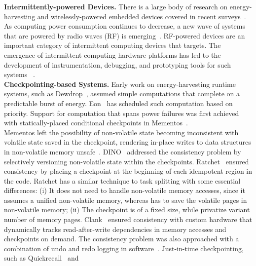 \textbf{Intermittently-powered Devices.} There is a large body of research on
energy-harvesting and wirelessly-powered embedded devices covered in recent
surveys~\cite{prasad_comst_2014,sample_procieee_2013,huang:commag:2015,visser_procieee_2013,kamalinejad_commag_2015,ku_cst_2016}.
As computing power consumption continues to decrease, a new wave of
systems that are powered by radio waves (RF) is
emerging~\cite{patel_pervasive_2017,rf_powered_computing_gollakota_2014,wisp5,moo,zhao_rfid_2015,holleman_biocas_2008,thomas_jbcs_2012,naderiparizi_rfid_2015,rodriguez_tbcs_2015,liu_sigcomm_2013,kicksat,nadeau_naturebio_2017}.
RF-powered devices are an important category of intermittent computing devices
that \sys targets.  The emergence of intermittent computing hardware platforms
has led to the development of instrumentation, debugging, and prototyping tools
for such systems
~\cite{hester_sensys_2014,hester_sensys_2015,edb,capybara,stork,wisent,flicker}. \\
%
\textbf{Checkpointing-based Systems.} Early work on energy-harvesting runtime
systems, such as Dewdrop~\cite{dewdrop}, assumed simple computations
that complete on a predictable burst of energy.
Eon~\cite{sorber_sensys_2007} has scheduled such computation based on priority.
Support for computation that spans power failures was first achieved with
statically-placed conditional checkpoints in Mementos~\cite{mementos}. \\
%
Mementos left the possibility of non-volatile state becoming inconsistent with
volatile state saved in the checkpoint, rendering in-place writes to data
structures in non-volatile memory unsafe~\cite{mspcdino}.
%
DINO~\cite{dino} addressed the consistency problem by selectively versioning
non-volatile state within the checkpoints. Ratchet~\cite{ratchet} ensured
consistency by placing a checkpoint at the beginning of each idempotent region
in the code. Ratchet has a similar technique to task splitting with some essential differences: (i) It does not need to handle non-volatile memory accesses, since it assumes a unified non-volatile memory, whereas \sys has to save the volatile pages in non-volatile memory; (ii) The checkpoint is of a fixed size, while \sys privatize variant number of memory pages.  Clank~\cite{hicks_isca_2017} ensured consistency with custom
hardware that dynamically tracks read-after-write dependencies in memory
accesses and checkpoints on demand. The consistency problem was also
approached with a combination of undo and redo logging in
software~\cite{baghsorkhi_cgo_2018}.
%
Just-in-time checkpointing, such as Quickrecall~\cite{quickrecall} and
